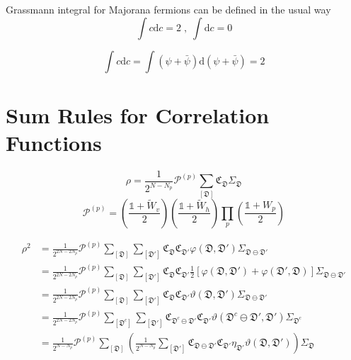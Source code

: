 \documentclass[12font]{article}
\numberwithin{equation}{section}    %
\theoremstyle{definition}
\newcommand{\lr}[1]{\left(  #1  \right)}
\newcommand{\lrm}[1]{\left[  #1  \right]}
\newcommand{\mrm}[1]{\mathrm{#1}}
\begin{document}
Grassmann integral for Majorana fermions can be defined in the usual way
\[
\int c\mrm{d}c = 2 \;,\; \int \mrm{d} c = 0
\]

\[
\int c\mrm{d} c = \int \lr{\psi + \bar{\psi}} \mrm{d} \lr{\psi + \bar{\psi}} = 2
\]


\section{Sum Rules for Correlation Functions}

\[
\rho 
= 
\frac{1}{2^{N-N_p}}
\mathcal{P}^{(p)}
\sum_{[\mathfrak{D}]}
\mathfrak{C}_{\mathfrak{D}}
\Sigma_{\mathfrak{D}}
\]
\[
\mathcal{P}^{(p)}
=
\lr{\frac{\mathds{1} + \tilde{W}_v}{2}}
\lr{\frac{\mathds{1} + \tilde{W}_h}{2}}
\prod_{p}\lr{\frac{\mathds{1} + W_p}{2}}
\]

\begin{align*}
    \rho^2 
    &= 
    \frac{1}{2^{2N-2N_p}}
    \mathcal{P}^{(p)}
    \sum_{[\mathfrak{D}]}\sum_{[\mathfrak{D}']}
    \mathfrak{C}_{\mathfrak{D}}
    \mathfrak{C}_{\mathfrak{D}'}
    \varphi(\mathfrak{D},\mathfrak{D}')
    \Sigma_{\mathfrak{D}\ominus\mathfrak{D}'}\\
    &=
    \frac{1}{2^{2N-2N_p}}
    \mathcal{P}^{(p)}
    \sum_{[\mathfrak{D}]}\sum_{[\mathfrak{D}']}
    \mathfrak{C}_{\mathfrak{D}}
    \mathfrak{C}_{\mathfrak{D}'}
    \frac{1}{2}
    \lrm{
    \varphi(\mathfrak{D},\mathfrak{D}')
    +
    \varphi(\mathfrak{D}',\mathfrak{D})
    }
    \Sigma_{\mathfrak{D}\ominus\mathfrak{D}'} \\
    &=
    \frac{1}{2^{2N-2N_p}}
    \mathcal{P}^{(p)}
    \sum_{[\mathfrak{D}]}\sum_{[\mathfrak{D}']}
    \mathfrak{C}_{\mathfrak{D}}
    \mathfrak{C}_{\mathfrak{D}'}
    \vartheta(\mathfrak{D},\mathfrak{D}')
    \Sigma_{\mathfrak{D}\ominus\mathfrak{D}'} \\
    &= 
    \frac{1}{2^{2N-2N_p}}
    \mathcal{P}^{(p)}
    \sum_{[\mathfrak{D}^c]}\sum_{[\mathfrak{D}']}
    \mathfrak{C}_{\mathfrak{D}^c\ominus\mathfrak{D}'}
    \mathfrak{C}_{\mathfrak{D}'}
    \vartheta(\mathfrak{D}^c\ominus\mathfrak{D}',\mathfrak{D}')
    \Sigma_{\mathfrak{D}^c} \\
    &=
    \frac{1}{2^{N-N_p}}
    \mathcal{P}^{(p)}
    \sum_{[\mathfrak{D}]}
    \lr{
        \frac{1}{2^{N-N_p}}
        \sum_{[\mathfrak{D}']}
        \mathfrak{C}_{\mathfrak{D}\ominus\mathfrak{D}'}
        \mathfrak{C}_{\mathfrak{D}'}
        \eta_{\mathfrak{D}'}
        \vartheta(\mathfrak{D},\mathfrak{D}')
    }
    \Sigma_{\mathfrak{D}}
\end{align*}
\end{document}
